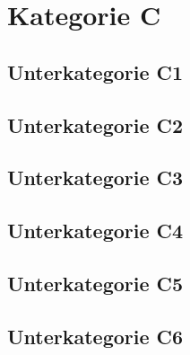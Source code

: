 \section{Kategorie C}
\subsection{Unterkategorie C1}



\subsection{Unterkategorie C2}


\subsection{Unterkategorie C3}


\subsection{Unterkategorie C4}

\subsection{Unterkategorie C5}


\subsection{Unterkategorie C6}


%
